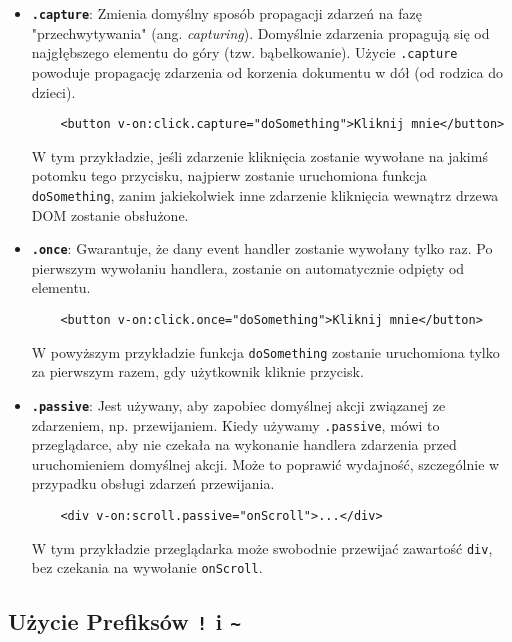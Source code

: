 \documentclass[a4paper,12pt]{article}
\begin{document}
\begin{itemize}
    \item \textbf{\texttt{.capture}}: Zmienia domyślny sposób propagacji zdarzeń na fazę "przechwytywania" (ang. \textit{capturing}). Domyślnie zdarzenia propagują się od najgłębszego elementu do góry (tzw. bąbelkowanie). Użycie \texttt{.capture} powoduje propagację zdarzenia od korzenia dokumentu w dół (od rodzica do dzieci).

    \begin{lstlisting}
    <button v-on:click.capture="doSomething">Kliknij mnie</button>
    \end{lstlisting}

    W tym przykładzie, jeśli zdarzenie kliknięcia zostanie wywołane na jakimś potomku tego przycisku, najpierw zostanie uruchomiona funkcja \texttt{doSomething}, zanim jakiekolwiek inne zdarzenie kliknięcia wewnątrz drzewa DOM zostanie obsłużone.

    \item \textbf{\texttt{.once}}: Gwarantuje, że dany event handler zostanie wywołany tylko raz. Po pierwszym wywołaniu handlera, zostanie on automatycznie odpięty od elementu.

    \begin{lstlisting}
    <button v-on:click.once="doSomething">Kliknij mnie</button>
    \end{lstlisting}

    W powyższym przykładzie funkcja \texttt{doSomething} zostanie uruchomiona tylko za pierwszym razem, gdy użytkownik kliknie przycisk.

    \item \textbf{\texttt{.passive}}: Jest używany, aby zapobiec domyślnej akcji związanej ze zdarzeniem, np. przewijaniem. Kiedy używamy \texttt{.passive}, mówi to przeglądarce, aby nie czekała na wykonanie handlera zdarzenia przed uruchomieniem domyślnej akcji. Może to poprawić wydajność, szczególnie w przypadku obsługi zdarzeń przewijania.

    \begin{lstlisting}
    <div v-on:scroll.passive="onScroll">...</div>
    \end{lstlisting}

    W tym przykładzie przeglądarka może swobodnie przewijać zawartość \texttt{div}, bez czekania na wywołanie \texttt{onScroll}.
\end{itemize}

\subsection{Użycie Prefiksów \texttt{!} i \texttt{\textasciitilde}}
\end{document}
